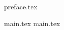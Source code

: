 \documentclass{myclass}
\begin{document}

\frontmatter

\maketitle

\tableofcontents

{preface.tex}


\mainmatter

{main.tex}
{main.tex}


\backmatter

\printindex
\end{document}
